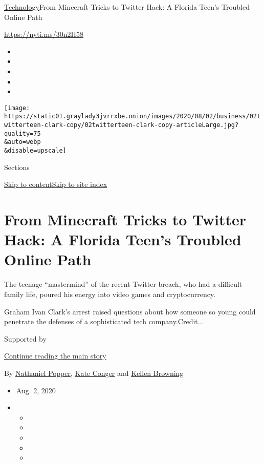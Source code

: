\href{/section/technology}{Technology}\textbar{}From Minecraft Tricks to
Twitter Hack: A Florida Teen's Troubled Online Path

\url{https://nyti.ms/30n2H58}

\begin{itemize}
\item
\item
\item
\item
\item
\end{itemize}

\texttt{[image: https://static01.graylady3jvrrxbe.onion/images/2020/08/02/business/02twitterteen-clark-copy/02twitterteen-clark-copy-articleLarge.jpg?quality=75\\\&auto=webp\\\&disable=upscale]}

Sections

\protect\hyperlink{site-content}{Skip to
content}\protect\hyperlink{site-index}{Skip to site index}

\hypertarget{from-minecraft-tricks-to-twitter-hack-a-florida-teens-troubled-online-path}{%
\section{From Minecraft Tricks to Twitter Hack: A Florida Teen's
Troubled Online
Path}\label{from-minecraft-tricks-to-twitter-hack-a-florida-teens-troubled-online-path}}

The teenage ``mastermind'' of the recent Twitter breach, who had a
difficult family life, poured his energy into video games and
cryptocurrency.

Graham Ivan Clark's arrest raised questions about how someone so young
could penetrate the defenses of a sophisticated tech company.Credit...

Supported by

\protect\hyperlink{after-sponsor}{Continue reading the main story}

By
\href{https://www.nytimes3xbfgragh.onion/by/nathaniel-popper}{Nathaniel
Popper}, \href{https://www.nytimes3xbfgragh.onion/by/kate-conger}{Kate
Conger} and
\href{https://www.nytimes3xbfgragh.onion/by/kellen-browning}{Kellen
Browning}

\begin{itemize}
\item
  Aug. 2, 2020
\item
  \begin{itemize}
  \item
  \item
  \item
  \item
  \item
  \end{itemize}
\end{itemize}

